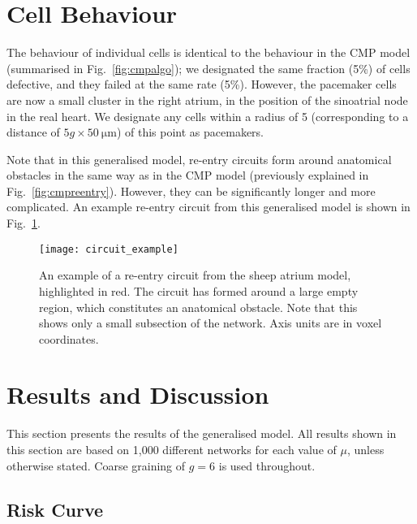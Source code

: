 \clearpage
\section{Cell Behaviour}

The behaviour of individual cells is identical to the behaviour in the CMP model (summarised in Fig.~\ref{fig:cmpalgo}); we designated the same fraction (5\%) of cells defective, and they failed at the same rate (5\%). However, the pacemaker cells are now a small cluster in the right atrium, in the position of the sinoatrial node in the real heart. We designate any cells within a radius of 5 (corresponding to a distance of $5g \times 50~\mathrm{\mu m}$) of this point as pacemakers.

Note that in this generalised model, re-entry circuits form around anatomical obstacles in the same way as in the CMP model (previously explained in Fig.~\ref{fig:cmpreentry}). However, they can be significantly longer and more complicated. An example re-entry circuit from this generalised model is shown in Fig.~\ref{fig:newreentry}.

\begin{figure}[H] \begin{mdframed}
    \centering
    \texttt{[image: circuit\_example]}
    \caption{An example of a re-entry circuit from the sheep atrium model, highlighted in red. The circuit has formed around a large empty region, which constitutes an anatomical obstacle. Note that this shows only a small subsection of the network. Axis units are in voxel coordinates.}
    \label{fig:newreentry}
\end{mdframed} \end{figure}

\clearpage 
\section{Results and Discussion}

This section presents the results of the generalised model. All results shown in this section are based on 1,000 different networks for each value of $\mu$, unless otherwise stated. Coarse graining of $g=6$ is used throughout.

\subsection{Risk Curve}


